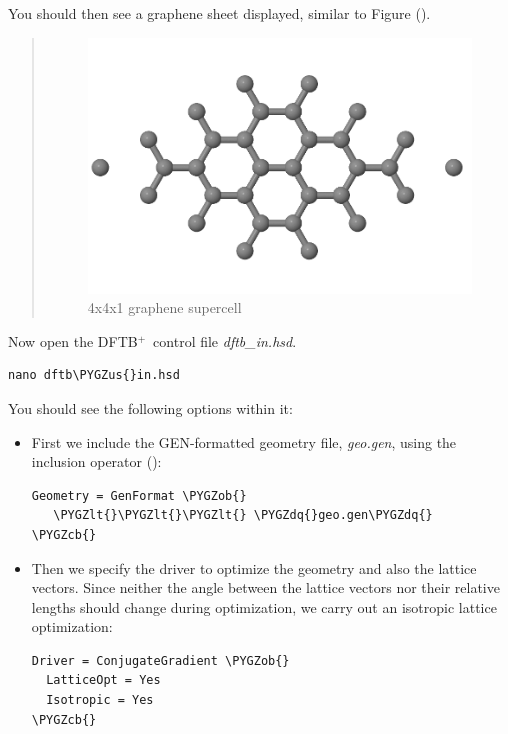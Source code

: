 \documentclass[a4paper,11pt,english]{sphinxmanual}
\newcommand{\dftbp}{\textsf{DFTB$^{\text{+}}$\ }} %
\def\PYGZus{\char`\_}
\def\PYGZob{\char`\{}
\def\PYGZcb{\char`\}}
\def\PYGZlt{\char`\<}
\def\PYGZdq{\char`\"}
\begin{document}
{{You should then see a graphene sheet displayed, similar to Figure
{\hyperref[electstruct:fig-graphene-441]{\emph{}}} ().
\begin{quote}
\begin{figure}[htbp]
\centering
\capstart
\includegraphics[width=0.600\linewidth]{geo-441.png}
\caption{4x4x1 graphene supercell}\label{electstruct:fig-graphene-441}\end{figure}
\end{quote}

Now open the \dftbp control file \emph{dftb\_in.hsd}.

\begin{Verbatim}[commandchars=\\\{\}]
nano dftb\PYGZus{}in.hsd
\end{Verbatim}

You should see the following options within it:
\begin{itemize}
\item {} 
First we include the GEN-formatted geometry file, \emph{geo.gen}, using
the inclusion operator (\code{\textless{}\textless{}\textless{}}):

\begin{Verbatim}[commandchars=\\\{\}]
Geometry = GenFormat \PYGZob{}
   \PYGZlt{}\PYGZlt{}\PYGZlt{} \PYGZdq{}geo.gen\PYGZdq{}
\PYGZcb{}
\end{Verbatim}

\item {} 
Then we specify the  driver to optimize the
geometry and also the lattice vectors. Since neither the angle
between the lattice vectors nor their relative lengths should change
during optimization, we carry out an isotropic lattice
optimization:

\begin{Verbatim}[commandchars=\\\{\}]
Driver = ConjugateGradient \PYGZob{}
  LatticeOpt = Yes
  Isotropic = Yes
\PYGZcb{}
\end{Verbatim}


\end{itemize}}}
\end{document}
